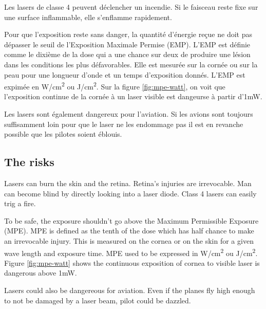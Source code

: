\begin{appendices}
\begin{fr}
	Les lasers de classe 4 peuvent déclencher un incendie. Si le faisceau reste fixe sur une surface inflammable, elle s'enflamme rapidement.
	
	Pour que l'exposition reste sans danger, la quantité d'énergie reçue ne doit pas dépasser le seuil de l'Exposition Maximale Permise (EMP).
	L'EMP est définie comme le dixième de la dose qui a une chance sur deux de produire une lésion dans les conditions les plus défavorables.
Elle est mesurée sur la cornée ou sur la peau pour une longueur d'onde et un temps d'exposition donnés.
L'EMP est expimée en \unit{W/cm^2} ou \unit{J/cm^2}.
Sur la figure \ref{fig:mpe-watt}, on voit que l'exposition continue de la cornée à un laser visible est dangeurse à partir d'1\unit{mW}.

Les lasers sont également dangereux pour l'aviation.
Si les avions sont toujours suffisamment loin pour que le laser ne les endommage pas il est en revanche possible que les pilotes soient éblouis.
\end{fr}

\begin{en}
\subsection*{The risks}
Lasers can burn the skin and the retina.
Retina's injuries are irrevocable.
Man can become blind by directly looking into a laser diode.
Class 4 lasers can easily trig a fire.

To be safe, the exposure shouldn't go above the Maximum Permissible Exposure (MPE).
MPE is defined as the tenth of the dose which has half chance to make an irrevocable injury.
This is measured on the cornea or on the skin for a given wave length and exposure time.
MPE used to be expressed in \unit{W/cm^2} ou \unit{J/cm^2}.
Figure \ref{fig:mpe-watt} shows the continuous exposition of cornea to visible laser is dangerous above 1\unit{mW}.

Lasers could also be dangereous for aviation.
Even if the planes fly high enough to not be damaged by a laser beam, pilot could be dazzled.
\end{en}


\end{appendices}
